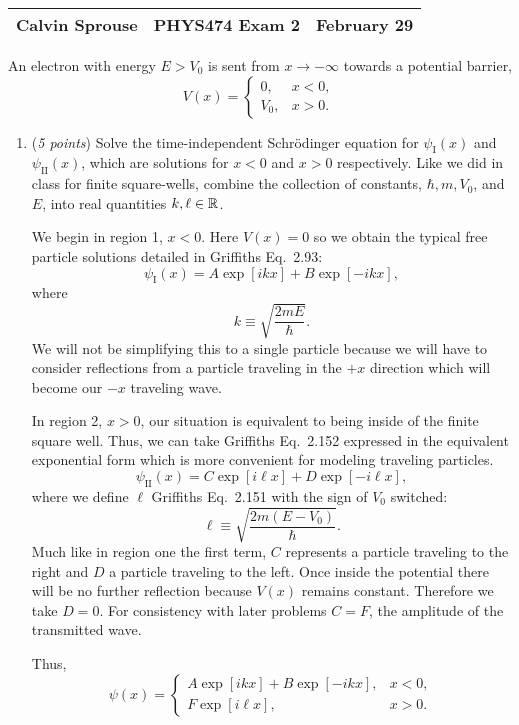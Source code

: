 \documentclass[a4paper, 12pt]{config/homework}
\begin{document}
\noindent
\begin{tabularx}{\textwidth}{>{\centering\arraybackslash}X>{\centering\arraybackslash}X>{\centering\arraybackslash}X}
Calvin Sprouse & PHYS474 Exam 2 & 2024 February 29\\
\midrule
\end{tabularx}

\vspace{\baselineskip}\noindent
An electron with energy \(E>V_0\) is sent from \(x\to-\infty \) towards a potential barrier,
\[V(x) = \begin{cases}
0, & x < 0, \\ V_0, & x > 0.
\end{cases}\]
\begin{enumerate}[label=(\alph*.)]
\item (\textit{5 points}) Solve the time-independent Schr{\"o}dinger equation for \(\psi_\text{I}(x)\) and \(\psi_\text{II}(x)\), which are solutions for \(x<0\) and \(x>0\) respectively. Like we did in class for finite square-wells, combine the collection of constants, \(\hbar,m,V_0\), and \(E\), into real quantities \(k,\ell\in\mathbb{R} \).

We begin in region 1, \(x<0\). Here \(V(x)=0\) so we obtain the typical free particle solutions detailed in Griffiths Eq.~2.93:
\[\psi_\text{I}(x)=A\exp\left[ikx\right]+B\exp\left[-ikx\right],\]
where
\[k \equiv \sqrt{\frac{2mE}{\hbar}}.\]
We will not be simplifying this to a single particle because we will have to consider reflections from a particle traveling in the \(+x\) direction which will become our \(-x\) traveling wave.

In region 2, \(x>0\), our situation is equivalent to being inside of the finite square well. Thus, we can take Griffiths Eq.~2.152 expressed in the equivalent exponential form which is more convenient for modeling traveling particles.
\[\psi_\text{II}(x) = C\exp[i\ell x] + D\exp[-i\ell x],\]
where we define \(\ell \) Griffiths Eq.~2.151 with the sign of \(V_0\) switched:
\[\ell \equiv \sqrt{\frac{2m(E-V_0)}{\hbar}}.\]
Much like in region one the first term, \(C\) represents a particle traveling to the right and \(D\) a particle traveling to the left. Once inside the potential there will be no further reflection because \(V(x)\) remains constant. Therefore we take \(D=0\). For consistency with later problems \(C=F\), the amplitude of the transmitted wave.

Thus,
\[\psi(x) = \begin{cases}
A\exp\left[ikx\right]+B\exp\left[-ikx\right], & x<0, \\ F\exp[i\ell x], & x>0.
\end{cases}\]


\end{enumerate}
\end{document}
